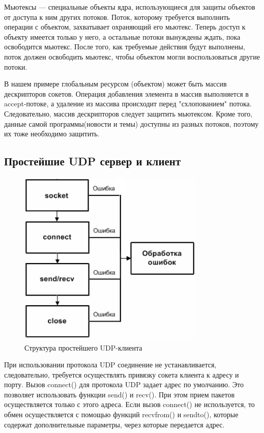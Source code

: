 \documentclass[a4paper]{article}
\begin{document}
Мьютексы — специальные объекты ядра, использующиеся для защиты объектов от доступа к ним других потоков. Поток, которому требуется выполнить операции с объектом, захватывает охраняющий его мьютекс. Теперь доступ к объекту имеется только у него, а остальные потоки вынуждены ждать, пока освободится мьютекс. После того, как требуемые действия будут выполнены, поток должен освободить мьютекс, чтобы объектом могли воспользоваться другие потоки. 

В нашем примере глобальным ресурсом (объектом) может быть массив дескрипторов сокетов. Операция добавления элемента в массив выполняется в accept-потоке, а удаление из массива происходит перед "схлопованием" потока. Следовательно, массив дескрипторов следует защитить мьютексом. Кроме того, данные самой программы(новости и темы) доступны из разных потоков, поэтому их тоже необходимо защитить.
\subsection{Простейшие UDP сервер и клиент}
\begin{figure}[H]
\begin{center}
\includegraphics[scale=0.5]{pics/tudpc.png}
\caption{Структура простейшего UDP-клиента}
\label{pic:tudpc}
\end{center}
\end{figure}

При использовании протокола UDP соединение не устанавливается, следовательно, требуется осуществлять привязку сокета клиента к адресу и порту. Вызов connect() для протокола UDP задает адрес по умолчанию. Это позволяет использовать функции send() и recv(). При этом прием пакетов осуществляется только с этого адреса. Если вызов connect() не используется, то обмен осуществляется с помощью функций recvfrom() и sendto(), которые содержат дополнительные параметры, через которые передается адрес.
\end{document}
